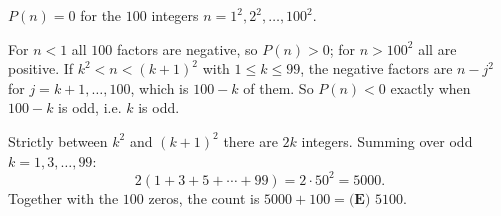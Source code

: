 $P(n)=0$ for the $100$ integers $n=1^2,2^2,\dots,100^2$.

For $n<1$ all $100$ factors are negative, so $P(n)>0$; for $n>100^2$ all are positive. If $k^2<n<(k+1)^2$ with $1\le k\le99$, the negative factors are $n-j^2$ for $j=k+1,\dots,100$, which is $100-k$ of them. So $P(n)<0$ exactly when $100-k$ is odd, i.e. $k$ is odd.

Strictly between $k^2$ and $(k+1)^2$ there are $2k$ integers. Summing over odd $k=1,3,\dots,99$:
\[2(1+3+5+\cdots+99)=2\cdot50^2=5000.\]
Together with the $100$ zeros, the count is $5000+100=\boxed{\textbf{(E) }5100}$.
